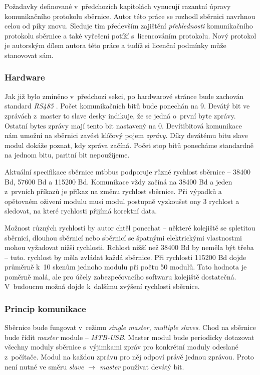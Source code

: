 Požadavky definované v~předchozích kapitolách vynucují razantní úpravy
komunikačního protokolu sběrnice. Autor této práce se rozhodl sběrnici
navrhnou celou od píky znovu. Sleduje tím především zajištění
\textit{přehlednosti} komunikačního protokolu sběrnice a také vyřešení potíží
s~licencováním protokolu. Nový protokol je autorským dílem autora této práce
a tudíž si licenční podmínky může stanovovat sám.

\subsubsection{Hardware}

Jak již bylo zmíněno v~předchozí sekci, po hardwarové stránce bude zachován
standard \textit{RS485} \cite{rs485}. Počet komunikačních bitů bude ponechán na 9.
Devátý bit ve zprávách z~master to slave desky indikuje, že se jedná o~první
byte zprávy. Ostatní bytes zprávy mají tento bit nastavený na 0. Devítibitová
komunikace nám umožní na sběrnici zavést klíčový pojem \textit{zprávy}. Díky
devátému bitu slave modul dokáže poznat, kdy zpráva začíná. Počet stop bitů
ponecháme standardně na jednom bitu, paritní bit nepoužijeme.

Aktuální specifikace sběrnice \gls{mtbbus} podporuje různé rychlost sběrnice –
38400 Bd, 57600 Bd a 115200 Bd. Komunikace vždy začíná na 38400 Bd a jeden
z~prvních příkazů je příkaz na změnu rychlost sběrnice. Při výpadků a opětovném
oživení modulu musí modul postupně vyzkoušet ony 3 rychlost a sledovat, na které
rychlosti přijímá korektní data.

Možnost různých rychlostí by autor chtěl ponechat – některé kolejiště se
spletitou sběrnicí, dlouhou sběrnicí nebo sběrnicí se špatnými elektrickými
vlastnostmi mohou vyžadovat nižší rychlosti. Rchlost nižší než 38400 Bd by
neměla být třeba – tuto. rychlost by měla zvládat každá sběrnice. Při rychlosti
115200 Bd dojde průměrně k~10 skenům jednoho modulu při počtu 50 modulů.
Tato hodnota je poměrně malá, ale pro účely zabezpečovacího softwaru kolejiště
dostatečná. V~budoucnu možná dojde k~dalšímu zvýšení rychlosti sběrnice.


\subsubsection{Princip komunikace}

Sběrnice bude fungovat v~režimu \textit{single master, multiple slaves}. Chod
na sběrnice bude řídit \textit{master} module – \textit{MTB-USB}. Master modul
bude periodicky dotazovat všechny moduly sběrnice s~výjimkami zpráv pro konkrétní
moduly odeslané z~počítače. Modul na každou zprávu pro něj odpoví právě jednou
zprávou. Proto není nutné ve směru \textit{slave $\rightarrow$ master} používat
devátý bit.

